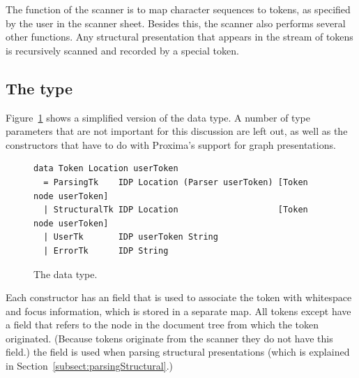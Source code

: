 \documentclass[12pt]{article}
\begin{document}
The function of the scanner is to map character sequences to tokens, as specified by the user in the scanner sheet. Besides this, the scanner also performs several other functions. Any structural presentation that appears in the stream of tokens is recursively scanned and recorded by a special token.

\subsection{The  type}

Figure~\ref{fig:tokenType} shows a simplified version of the  data type. A number of type parameters that are not important for this discussion are left out, as well as the constructors that have to do with Proxima's support for graph presentations. 

\begin{figure}
\begin{center}
\begin{footnotesize}
\begin{verbatim}
data Token Location userToken 
  = ParsingTk    IDP Location (Parser userToken) [Token node userToken]
  | StructuralTk IDP Location                    [Token node userToken]
  | UserTk       IDP userToken String 
  | ErrorTk      IDP String 
\end{verbatim}
\end{footnotesize}
\caption{The  data type.} \label{fig:tokenType} 
\end{center}
\end{figure}


Each constructor has an  field that is used to associate the token with whitespace and focus information, which is stored in a separate map. All tokens except  have a  field that refers to the node in the document tree from which the token originated. (Because  tokens originate from the scanner they do not have this field.) the  field is used when parsing structural presentations (which is explained in Section~\ref{subsect:parsingStructural}.)
\end{document}
